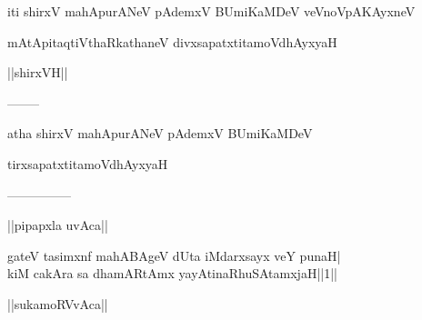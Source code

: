 \documentclass{article}
\begin{document}
\begin{center}
iti shirxV mahApurANeV pAdemxV BUmiKaMDeV veVnoVpAKAyxneV
\end{center}

\begin{center}
mAtApitaqtiVthaRkathaneV divxsapatxtitamoVdhAyxyaH
\end{center}

\begin{center}
||shirxVH||
\end{center}

\begin{center}
--------
\end{center}

\begin{center}
atha shirxV mahApurANeV pAdemxV BUmiKaMDeV
\end{center}

\begin{center}
tirxsapatxtitamoVdhAyxyaH
\end{center}

\begin{center}

---------------
\end{center}

\begin{center}
||pipapxla uvAca||
\end{center}

gateV tasimxnf mahABAgeV dUta iMdarxsayx veY punaH|\\
kiM cakAra sa dhamARtAmx yayAtinaRhuSAtamxjaH||1||\\

\begin{center}
||sukamoRVvAca||
\end{center}
\end{document}
